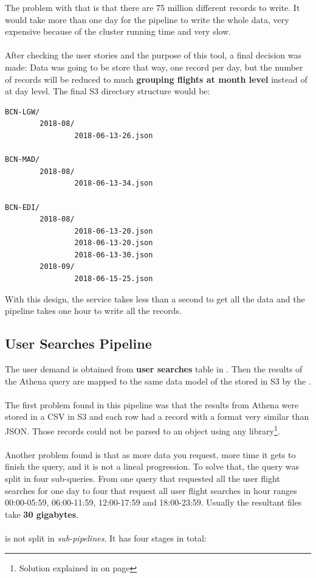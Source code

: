 The problem with that is that there are 75 million different records to write. It would take more than one day for the pipeline to write the whole data, very expensive because of the  cluster running time and very slow. 
\\\\
After checking the user stories and the purpose of this tool, a final decision was made: Data was going to be store that way, one record per day, but the number of records will be reduced to much \textbf{grouping flights at month level} instead of at day level. The final S3 directory structure would be:

\begin{verbatim}
BCN-LGW/
        2018-08/
                2018-06-13-26.json

BCN-MAD/
        2018-08/
                2018-06-13-34.json

BCN-EDI/
        2018-08/
                2018-06-13-20.json
                2018-06-13-20.json
                2018-06-13-30.json
        2018-09/
                2018-06-15-25.json
\end{verbatim}

With this design, the service takes less than a second to get all the data and the pipeline takes one hour to write all the records.

\subsection{User Searches Pipeline} \label{user-searches-pipeline}

The user demand is obtained from \textbf{user searches} table in . Then the results of the Athena query are mapped to the same data model of the stored in S3 by the .
\\\\
The first problem found in this pipeline was that the results from Athena were stored in a CSV\cite{csv} in S3 and each row had a record with a format very similar than JSON\cite{json}. Those records could not be parsed to an object using any library\footnote{Solution explained in  on page \pageref{regex}}.
\\\\
Another problem found is that as more data you request, more time it gets to finish the query, and it is not a lineal progression. To solve that, the query was split in four sub-queries. From one query that requested all the user flight searches for one day to four that request all user flight searches in hour ranges 00:00-05:59, 06:00-11:59, 12:00-17:59 and 18:00-23:59. Usually the resultant files take \textbf{30 gigabytes}.
\\\\
 is not split in \textit{sub-pipelines}. It has four stages in total:

